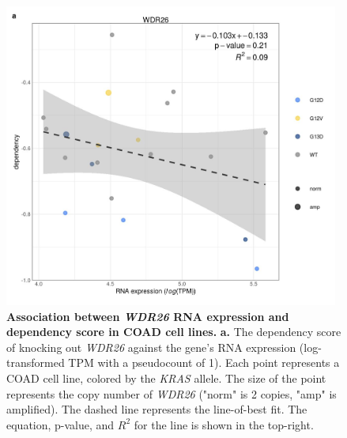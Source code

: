 \documentclass[english, 12pt, letterpaper]{article}
\newcommand{\KRAS}{\emph{KRAS}}
\begin{document}
\begin{figure}[p]
\centering
\includegraphics[height=100mm]{figures/SuppFigure_15.jpeg}
\caption{
    \textbf{Association between \emph{WDR26} RNA expression and dependency score in COAD cell lines.}
    \textbf{a.} The dependency score of knocking out \emph{WDR26} against the gene's RNA expression (log-transformed TPM with a pseudocount of 1). Each point represents a COAD cell line, colored by the \KRAS{} allele. The size of the point represents the copy number of \emph{WDR26} ("norm" is 2 copies, "amp" is amplified).
    The dashed line represents the line-of-best fit.
    The equation, p-value, and $R^2$ for the line is shown in the top-right.
}
\label{sfig:coad_dep_wdr26}
\end{figure}
\end{document}
